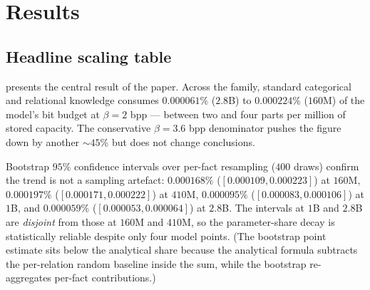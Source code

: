 \section{Results}
\label{sec:results}

\subsection{Headline scaling table}

 presents the central result of the paper. Across the \pythia family, standard categorical and relational knowledge consumes \(\mathbf{0.000061\%}\) (\(2.8\)B) to \(\mathbf{0.000224\%}\) (\(160\)M) of the model's bit budget at \(\beta = 2\) bpp --- between two and four parts per million of stored capacity. The conservative \(\beta = 3.6\) bpp denominator pushes the figure down by another \(\sim 45\%\) but does not change conclusions.

\begin{table}[t]
\centering
\caption{Standard-knowledge accuracy, acquired bits, and parameter share across the \pythia family. \bear and \taxi accuracies are macro-averages over the benchmark; bits are computed by \eqref{eq:bits}. \emph{Combined bits} sum \bear and \taxi acquired bits. Best (smallest) shares would correspond to most-diluted parameter footprints; we bold the headline figures at \(\beta = 2\) bpp.}
\label{tab:headline}
\end{table}

Bootstrap \(95\%\) confidence intervals over per-fact resampling (\(400\) draws) confirm the trend is not a sampling artefact: \(0.000168\%\) (\([0.000109, 0.000223]\)) at \(160\)M, \(0.000197\%\) (\([0.000171, 0.000222]\)) at \(410\)M, \(0.000095\%\) (\([0.000083, 0.000106]\)) at \(1\)B, and \(0.000059\%\) (\([0.000053, 0.000064]\)) at \(2.8\)B. The intervals at \(1\)B and \(2.8\)B are \emph{disjoint} from those at \(160\)M and \(410\)M, so the parameter-share decay is statistically reliable despite only four model points. (The bootstrap point estimate sits below the analytical share because the analytical formula subtracts the per-relation random baseline inside the sum, while the bootstrap re-aggregates per-fact contributions.)

